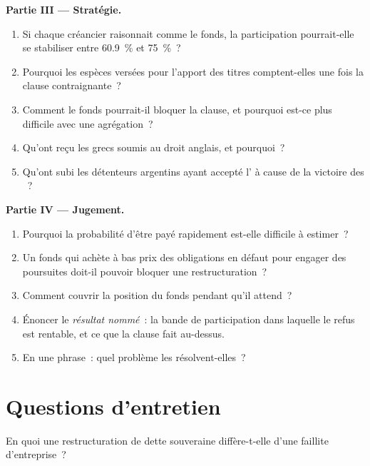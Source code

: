 \begin{problem}
\medskip\noindent\textbf{Partie III --- Stratégie.}
\begin{enumerate}[resume]
\item Si chaque créancier raisonnait comme le fonds, la participation pourrait-elle se stabiliser entre 60.9~\%
et 75~\%~?
\item Pourquoi les espèces versées pour l'apport des titres comptent-elles une fois la clause contraignante~?
\item Comment le fonds pourrait-il bloquer la clause, et pourquoi est-ce plus difficile avec une agrégation~?
\item Qu'ont reçu les  grecs soumis au droit anglais, et pourquoi~?
\item Qu'ont subi les détenteurs argentins ayant accepté l' à cause de la victoire des ~?
\end{enumerate}

\medskip\noindent\textbf{Partie IV --- Jugement.}
\begin{enumerate}[resume]
\item Pourquoi la probabilité d'être payé rapidement est-elle difficile à estimer~?
\item Un fonds qui achète à bas prix des obligations en défaut pour engager des poursuites doit-il pouvoir bloquer
une restructuration~?
\item Comment couvrir la position du fonds pendant qu'il attend~?
\item Énoncer le \emph{résultat nommé}~: la bande de participation
dans laquelle le refus est rentable, et ce que la clause fait au-dessus.
\item En une phrase~: quel problème les  résolvent-elles~?
\end{enumerate}
\end{problem}

\section{Questions d'entretien}

\begin{interviewq}\label{iq:m2:distressed-sovereign-and-bank-capital-credit:1}
En quoi une restructuration de dette souveraine diffère-t-elle d'une faillite d'entreprise~?
\end{interviewq}

